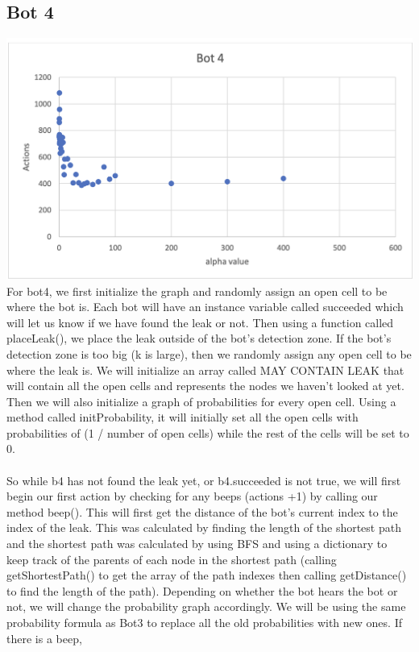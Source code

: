 \documentclass[12pt]{article}
\begin{document}
\subsection*{Bot 4}
\includegraphics*[scale=0.5]{Bot4}\\
For bot4, we first initialize the graph and randomly assign an open cell to be where the bot is. 
Each bot will have an instance variable called succeeded which will let us know if we have found
 the leak or not. Then using a function called placeLeak(), we place the leak outside of the bot's
  detection zone. If the bot's detection zone is too big (k is large), then we randomly assign any 
  open cell to be where the leak is. We will initialize an array called MAY CONTAIN LEAK that will 
  contain all the open cells and represents the nodes we haven't looked at yet. Then we will also 
  initialize a graph of probabilities for every open cell. Using a method called initProbability, 
  it will initially set all the open cells with probabilities of (1 / number of open cells) while 
  the rest of the cells will be set to 0.  
\\
\\
So while b4 has not found the leak yet, or b4.succeeded is not true, we will first begin our 
first action by checking for any beeps (actions +1) by calling our method beep(). This will first 
get the distance of the bot's current index to the index of the leak. This was calculated by
 finding the length of the shortest path and the shortest path was calculated by using BFS and 
 using a dictionary to keep track of the parents of each node in the shortest path 
 (calling getShortestPath() to get the array of the path indexes then calling getDistance() to 
 find the length of the path). Depending on whether the bot hears the bot or not, we will change 
 the probability graph accordingly. We will be using the same probability formula as Bot3 to 
 replace all the old probabilities with new ones. If there is a beep,  
\end{document}
